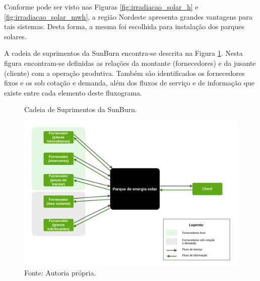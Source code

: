 Conforme pode ser visto nas Figuras \ref{fig:irradiacao_solar_h} e \ref{fig:irradiacao_solar_mwh}, a região Nordeste apresenta grandes vantagens para tais sistemas. Desta forma, a mesma foi escolhida para instalação dos parques solares.

A cadeia de suprimentos da SunBurn encontra-se descrita na Figura \ref{fig:cadeia_suprimentos_sunburn}. Nesta figura encontram-se definidas as relações da montante (fornecedores) e da jusante (cliente) com a operação produtiva. Também são identificados os fornecedores fixos e os sob cotação e demanda, além dos fluxos de serviço e de informação que existe entre cada elemento deste fluxograma.


\begin{figure}[H]
    \centering
    \caption{Cadeia de Suprimentos da SunBurn.}
    \includegraphics[width = \textwidth]{images/cadeia_suprimentos_sunburn.png}
    \caption*{Fonte: Autoria própria.}
    \label{fig:cadeia_suprimentos_sunburn}
\end{figure}
